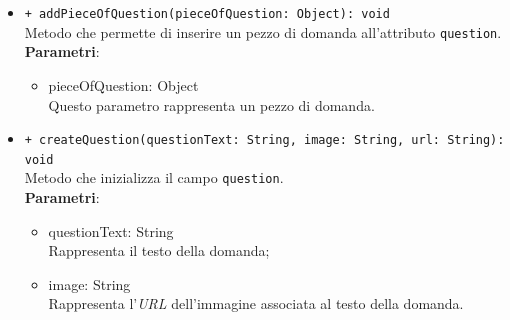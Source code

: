 \begin{itemize}
\begin{itemize}
				\item \texttt{+ addPieceOfQuestion(pieceOfQuestion: Object): void} \\
				Metodo che permette di inserire un pezzo di domanda all'attributo \texttt{question}.\\
				\textbf{Parametri}:
				\begin{itemize}
					\item {pieceOfQuestion: Object}\\
					Questo parametro rappresenta un pezzo di domanda.
				\end{itemize}
				
				\item \texttt{+ createQuestion(questionText: String, image: String, url: String): void} \\
				Metodo che inizializza il campo \texttt{question}.\\
				\textbf{Parametri}:
				\begin{itemize}
					\item {questionText: String}\\
					Rappresenta il testo della domanda;
					\item {image: String}\\
					Rappresenta l'\textit{URL} dell'immagine associata al testo della domanda. 
				\end{itemize}	
			\end{itemize}
		\end{itemize}
		
		